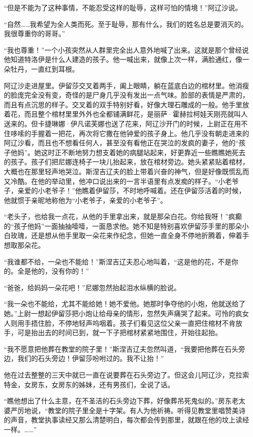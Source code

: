 \par “但是不能为了这种事情，不能忍受这样的耻辱，这样可怕的情境！”阿辽沙说。
\par “自然……我希望为全人类而死。至于耻辱，那有什么，我们的姓名总是要消灭的。我很尊重你的哥哥。”
\par “我也尊重！”一个小孩突然从人群里完全出人意外地喊了出来。这就是那个曾经说他知道特洛伊是什么人建造的孩子。他一喊出来，就像上次一样，满脸通红，像一朵牡丹，一直红到耳根。
\par 阿辽沙走进屋里。伊留莎交叉着两手，阖上眼睛，躺在蓝底白边的棺材里。他消瘦的脸庞完全没有变，奇怪的是尸身几乎没有发出一点气味。脸部的表情是严肃的，而且有点沉思的样子。交叉着的双手特别好看，好像大理石雕成的一般。他手里放着花，而且整个棺材里里外外也全都铺满鲜花，是丽萨·霍赫拉柯娃天刚亮就叫人送来的。但卡捷琳娜·伊凡诺芙娜也送了花来，阿辽沙开门的时候，上尉正在用不住哆嗦的手握着一把花，再次将它撒在他钟爱的孩子身上。他几乎没有朝走进来的阿辽沙看，而且也不想看任何人，甚至没有看他正在哭泣的发疯的妻子，他的“孩子他妈”。她这时正不断地努力想支着她的病腿站起来，好更靠近一些瞧瞧她死去的孩子。孩子们把尼娜连椅子一块儿抬起来，放在棺材旁边。她头紧紧贴着棺材，大概也在那里轻声地哭泣。斯涅吉辽夫的脸上带着兴奋的神气，但是好像既慌乱而又冷酷。在他的举动里，他冲口说出来的一言半语里有点发痴的样子。“小老爷子，亲爱的小老爷子！”他瞧着伊留莎，不时地呼喊着。还在伊留莎活着的时候，他就惯于亲昵地称他为“小老爷子，亲爱的小老爷子”。
\par “老头子，也给我一点花，从他的手里拿出来，就是那朵白花。你给我呀！”疯癫的“孩子他妈”一面抽抽噎噎，一面恳求他。她不知是特别喜欢伊留莎手里的那朵小白玫瑰，还是想从他手里取一朵花来作纪念，但她一直全身不停地折腾着，伸着手想取那朵花。
\par “我谁都不给，一朵也不能给！”斯涅吉辽夫忍心地叫着，“这是他的花，不是你的。全是他的，没有你的！”
\par “爸爸，给妈妈一朵花吧！”尼娜忽然抬起泪水纵横的脸说。
\par “我一朵也不能给，尤其不能给她！她不爱他。她那时争夺他的小炮，他就送给了她。”上尉一想起伊留莎把小炮让给母亲的情形，忽然失声痛哭了起来。可怜的疯女人则用手捂住脸，不停地轻声呜咽着。孩子们看见这位父亲一直把住棺材不肯放手，可是抬出去的时间已到，就一下子把棺材紧紧地围住，开始往起抬。
\par “我不愿意把他葬在教堂的院子里！”斯涅吉辽夫忽然叫道，“我要把他葬在石头旁边，我们的石头旁边！伊留莎吩咐过的。我不让抬！”
\par 他在过去整整的三天中就已一直在说要葬在石头旁边了。但这会儿阿辽沙，克拉索特金，女房东，女房东的姊妹，还有男孩们，全说了话。
\par “瞧他想出了什么主意，在不圣洁的石头旁边下葬，好像葬吊死鬼似的。”房东老太婆严厉地说，“教堂的院子里全是十字架。有人为他祈祷。听得见教堂里唱赞美诗的声音，教堂执事读经又那么清楚明白，每次都会传到那里，就跟在他的坟上读经一样。……”
